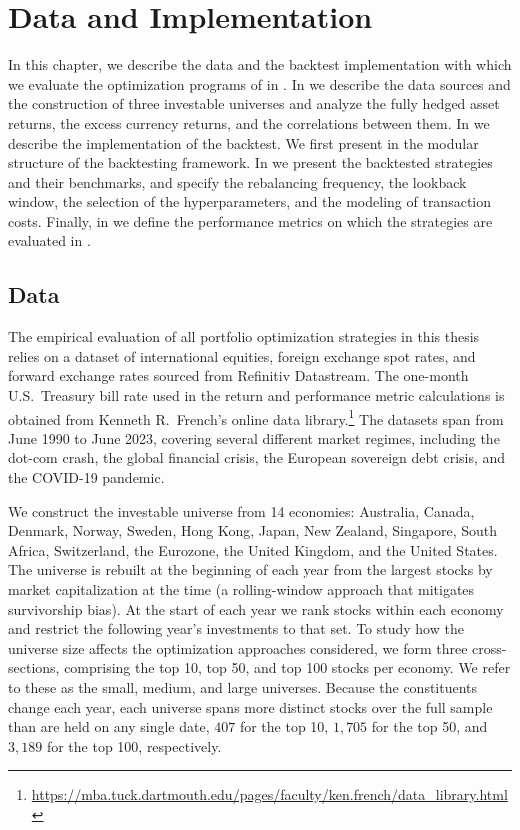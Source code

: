 \chapter{Data and Implementation}\label{chap:data-and-implementation}

In this chapter, we describe the data and the backtest implementation with which we evaluate the optimization programs
of  in . In 
we describe the data sources and the construction of three investable universes and analyze the fully hedged asset returns, 
the excess currency returns, and the
correlations between them. In  we describe the implementation of the backtest. We
first present in  the modular structure of the backtesting framework. In
 we present the backtested strategies and their benchmarks, and specify the
rebalancing frequency, the lookback window, the selection of the hyperparameters, and the modeling of transaction
costs. Finally, in  we define the performance metrics on which the strategies
are evaluated in .

\section{Data}\label{sec:data}

The empirical evaluation of all portfolio optimization strategies in this thesis relies on
a dataset of international equities, foreign exchange spot rates, and forward
exchange rates sourced from Refinitiv Datastream. The one-month U.S.\ Treasury bill rate used in the return and
performance metric calculations is obtained from
Kenneth R.\ French's online data library.\footnote{\url{https://mba.tuck.dartmouth.edu/pages/faculty/ken.french/data_library.html}}
The datasets span from June 1990 to June 2023, covering several different market regimes, including
the dot-com crash, the global financial crisis, the European sovereign debt crisis, and the
COVID-19 pandemic.

We construct the investable universe from 14 economies: Australia,
Canada, Denmark, Norway, Sweden, Hong Kong, Japan, New Zealand, Singapore, South
Africa, Switzerland, the Eurozone, the United Kingdom, and the United States. The universe is
rebuilt at the beginning of each year from the largest stocks by market capitalization at the time (a rolling-window
approach that mitigates survivorship bias). At the start of each year we rank stocks within
each economy and restrict the following year's investments to that set. To study how the
universe size affects the optimization approaches considered, we form three cross-sections, comprising the
top 10, top 50, and top 100 stocks per economy. We refer to these as the small, medium, and large universes. Because the constituents change each
year, each universe spans more distinct stocks over the full sample than are held on any
single date, $407$ for the top 10, $1{,}705$ for the top 50, and $3{,}189$ for the top 100, respectively.

